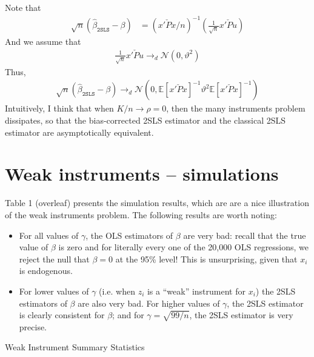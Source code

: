 \documentclass[12pt]{article}
\newcommand{\E}{\mathbb{E}}
\newcommand{\mtx}[1]{\ensuremath{\bm{\mathit{#1}}}}
\newcommand{\N}{\mathcal{N}}
\begin{document}
\subsubsection{}
Note that
\begin{align*}
\sqrt{n}(\hat\beta_{\texttt{2SLS}} - \beta) &= (\mtx{x}'\check{\mtx{P}}\mtx{x}/n)^{-1}(\frac{1}{\sqrt{n}}\mtx{x}'\check{\mtx{P}}\mtx{u})
\end{align*}
And we assume that
\begin{align*}
\frac{1}{\sqrt{n}}\mtx{x}'\check{\mtx{P}}\mtx{u} \to_d \N(0, \vartheta^2)
\end{align*}
Thus,
\begin{align*}
\sqrt{n}(\hat\beta_{\texttt{2SLS}} - \beta) \to_d \N(0, \E[\mtx{x}'\check{\mtx{P}}\mtx{x}]^{-1}\vartheta^2\E[\mtx{x}'\check{\mtx{P}}\mtx{x}]^{-1})
\end{align*}
Intuitively, I think that when $K/n \to \rho = 0$, then the many instruments problem dissipates, so that the bias-corrected 2SLS estimator and the classical 2SLS estimator are asymptotically equivalent.

\newpage

\section{Weak instruments -- simulations}
Table 1 (overleaf) presents the simulation results, which are are a nice illustration of the weak instruments problem. The following results are worth noting:
\begin{itemize}
\item For all values of $\gamma$, the OLS estimators of $\beta$ are very bad: recall that the true value of $\beta$ is zero and for literally every one of the 20,000 OLS regressions, we reject the null that $\beta=0$ at the 95\% level! 
This is unsurprising, given that $x_i$ is endogenous.
\item For lower values of $\gamma$ (i.e. when $z_i$ is a ``weak'' instrument for $x_i$) the 2SLS estimators of $\beta$ are also very bad. For higher values of $\gamma$, the 2SLS estimator is clearly consistent for $\beta$; and for $\gamma = \sqrt{99/n}$, the 2SLS estimator is very precise.
\end{itemize}


\begin{landscape}
\begin{table}[!htp]
\centering
\renewcommand{\arraystretch}{1.5}  
\caption{Weak Instrument Summary Statistics}\label{tab:weak_IV_simulation}
\resizebox{0.45\paperwidth}{0.021\paperwidth}{\subfloat[][$\gamma^2=0/n$ ($F\approx1$)]{}}
\resizebox{0.45\paperwidth}{0.021\paperwidth}{\subfloat[][$\gamma^2=0.25/n$ ($F\approx1.25$)]{}}\\
\resizebox{0.45\paperwidth}{0.021\paperwidth}{\subfloat[][$\gamma^2=9/n$ ($F\approx10$)]{}}
\resizebox{0.45\paperwidth}{0.021\paperwidth}{\subfloat[][$\gamma^2=99/n$ ($F\approx100$)]{}}\\
\end{table}
\end{landscape}
\end{document}

